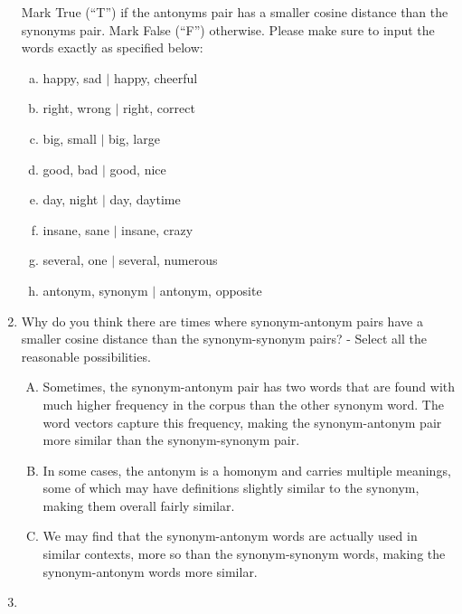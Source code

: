 \begin{enumerate}[1.]
Mark True (``T'') if the antonyms pair has a smaller cosine distance than the synonyms pair. Mark False (``F'') otherwise. Please make sure to input the words exactly as specified below: 
\begin{enumerate}[a.]
\item \textsf{happy, sad $\vert$ happy, cheerful}
\item \textsf{right, wrong $\vert$ right, correct}
\item \textsf{big, small $\vert$ big, large}
\item \textsf{good, bad $\vert$ good, nice}
\item \textsf{day, night $\vert$ day, daytime}
\item \textsf{insane, sane $\vert$ insane, crazy}
\item \textsf{several, one $\vert$ several, numerous}
\item \textsf{antonym, synonym $\vert$ antonym, opposite}
\end{enumerate}


\item {}

Why do you think there are times where synonym-antonym pairs have a smaller cosine distance than the synonym-synonym pairs? - Select all the reasonable possibilities.

\begin{enumerate}[A)]
\item Sometimes, the synonym-antonym pair has two words that are found with much higher frequency in the corpus than the other synonym word. The word vectors capture this frequency, making the synonym-antonym pair more similar than the synonym-synonym pair.

\item In some cases, the antonym is a homonym and carries multiple meanings, some of which may have definitions slightly similar to the synonym, making them overall fairly similar.

\item We may find that the synonym-antonym words are actually used in similar contexts, more so than the synonym-synonym words, making the synonym-antonym words more similar.
\end{enumerate}


\item {}


\end{enumerate}
